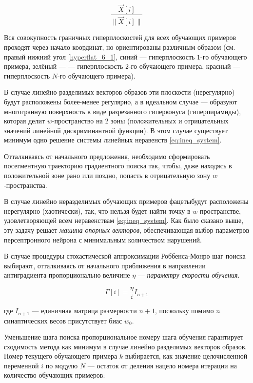 \documentclass{article}
\numberwithin{equation}{subsection}
\begin{document}
\begin{equation*}
    \dfrac{\vec{X}[i]}{\|\vec{X}[i]\|}
\end{equation*}

Вся совокупность граничных гиперплоскостей для всех обучающих примеров проходят через 
начало координат, но ориентированы различным образом (см. правый нижний угол 
\ref{hyperflat_6_1}, синий --- гиперплоскость $1$-го обучающего примера, зелёный ---
--- гиперплоскость $2$-го обучающего примера, красный --- гиперплоскость $N$-го 
обучающего примера).

В случае линейно разделимых векторов образов эти плоскости (\glqq нерегулярно\grqq) 
будут расположены более-менее регулярно, а в идеальном случае --- образуют 
многогранную поверхность в виде разрезанного гиперконуса (гиперпирамиды), 
которая делит $w$-пространство на 2 зоны (положительных и отрицательных значений 
линейной дискриминантной функции).
В этом случае существует минимум одно решение системы линейных неравенств 
\ref{eq:ineq_system}.

Отталкиваясь от начального предложения, необходимо сформировать посегментную траекторию 
градиентного поиска так, чтобы, даже находясь в положительной зоне рано или поздно,
попасть в отрицательную зону $w$-пространства. 

В случае линейно неразделимых обучающих примеров \glqq фацеты\grqq будут расположены
нерегулярно (хаотически), так, что нельзя будет найти точку в $w$-пространстве, 
удовлетворяющей всем неравенствам \ref{eq:ineq_system}. Как было сказано выше,
эту задачу решает \textit{машина опорных векторов}, обеспечивающая выбор параметров
персептронного нейрона с минимальным количеством нарушений.

В случае процедуры стохастической аппроксимации Роббенса-Монро шаг поиска выбирают,
отталкиваясь от начального приближения в направлении антиградиента пропорционально
величине $\eta$ --- \textit{параметру скорости обучения}.

\begin{equation}
    \Gamma[i] = \dfrac{\eta}{i} I_{n+1}
\end{equation}

\noindent
где $I_{n+1}$ --- единичная матрица размерности $n+1$, поскольку помимо $n$ синаптических
весов присутствует биас $w_0$.

Уменьшение шага поиска пропорциональное номеру шага обучения гарантирует сходимость метода
как минимум в случае линейно разделимых векторов образов.
Номер текущего обучающего примера $k$ выбирается, как значение целочисленной переменной $i$ 
по модулю $N$ --- остаток от деления нацело номера итерации на количество обучающих 
примеров:
\end{document}
